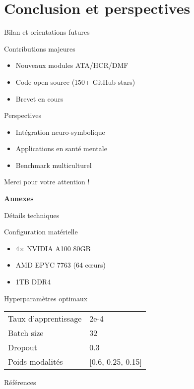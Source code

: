 \documentclass[10pt, aspectratio=169]{beamer} %
\begin{document}
\section{Conclusion et perspectives}
\begin{frame}{Bilan et orientations futures}
    \begin{block}{Contributions majeures}
        \begin{itemize}
            \item Nouveaux modules ATA/HCR/DMF
            \item Code open-source (150+ GitHub stars)
            \item Brevet en cours
        \end{itemize}
    \end{block}
    
    \begin{block}{Perspectives}
        \begin{itemize}
            \item Intégration neuro-symbolique
            \item Applications en santé mentale
            \item Benchmark multiculturel
        \end{itemize}
    \end{block}
    
    \begin{center}
        \large \color{primary} Merci pour votre attention !
    \end{center}
    
    \footnotesize
\end{frame}

\appendix
\begin{frame}
    \centering
    \Large \textbf{Annexes}
\end{frame}

\begin{frame}{Détails techniques}
    \begin{block}{Configuration matérielle}
        \begin{itemize}
            \item 4× NVIDIA A100 80GB
            \item AMD EPYC 7763 (64 cœurs)
            \item 1TB DDR4
        \end{itemize}
    \end{block}
    
    \begin{block}{Hyperparamètres optimaux}
        \begin{tabular}{ll}
            Taux d'apprentissage & 2e-4 \\
            Batch size & 32 \\
            Dropout & 0.3 \\
            Poids modalités & [0.6, 0.25, 0.15] \\
        \end{tabular}
    \end{block}
\end{frame}

\begin{frame}[allowframebreaks]{Références}
    \printbibliography[heading=none]
\end{frame}
\end{document}
